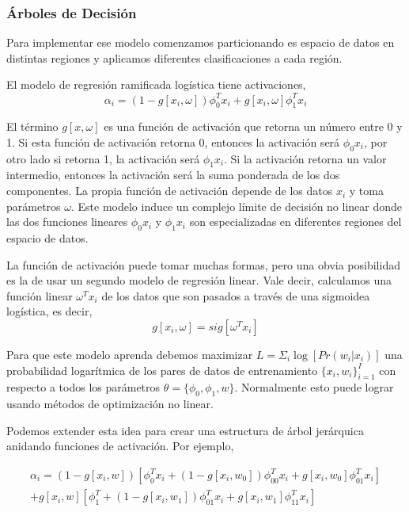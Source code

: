 \documentclass[letter,12pt]{report}
\begin{document}
\subsubsection{Árboles de Decisión}
Para implementar ese modelo \cite{Trees} comenzamos particionando es espacio de datos en
distintas regiones y aplicamos diferentes clasificaciones a cada región.

El modelo de regresión ramificada logística tiene activaciones,
$$\alpha_i=(1-g[x_i,\omega])\phi_0^T x_i+g[x_i,\omega]\phi_1^T x_i$$

El término $g[x,\omega]$ es una función de activación que retorna un número entre 0 y 1.
Si esta función de activación retorna 0, entonces la activación será $\phi_0x_i$, por
otro lado si retorna 1, la activación será $\phi_1x_i$. Si la activación retorna un valor
intermedio, entonces la activación será la suma ponderada de los dos componentes. La
propia función de activación depende de los datos $x_i$ y toma parámetros $\omega$. Este
modelo induce un complejo límite de decisión no linear donde las dos funciones lineares
$\phi_0x_i$ y $\phi_1x_i$ son especializadas en diferentes regiones del espacio de datos.

La función de activación puede tomar muchas formas, pero una obvia posibilidad es la de
usar un segundo modelo de regresión linear. Vale decir, calculamos una función linear
$\omega^Tx_i$ de los datos que son pasados a través de una sigmoidea logística, es decir,
$$g[x_i,\omega]=sig[\omega^Tx_i]$$

Para que este modelo aprenda debemos maximizar $L = \Sigma_i \log[Pr(w_i|x_i)]$ una
probabilidad logarítmica de los pares de datos de entrenamiento $\{x_i,w_i\}_{i=1}^I$ con
respecto a todos los parámetros $\theta=\{\phi_0,\phi_1,w\}$. Normalmente esto puede
lograr usando métodos de optimización no linear.

Podemos extender esta idea para crear una estructura de árbol jerárquica anidando
funciones de activación. Por ejemplo,

\begin{equation}
    \begin{split}
        \alpha_i = (1-g[x_i, w]) \left[\phi_0^Tx_i+(1 - g[x_i,
        w_0])\phi_{00}^Tx_i+g[x_i,w_0]\phi_{01}^Tx_i\right] \\
        + g[x_i,w]\left[\phi_1^T + (1 -
        g[x_i, w_1])\phi_{01}^Tx_i + g[x_i, w_1]\phi_{11}^Tx_i\right]
    \end{split}
\end{equation}
\end{document}
